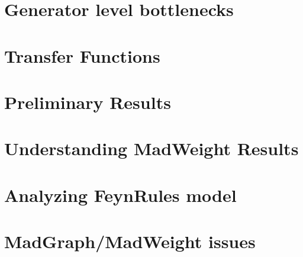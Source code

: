 \documentclass[a4paper,12pt]{book}
\begin{document}
\chapter{Generator level bottlenecks}
%

\chapter{Transfer Functions}
%

\chapter{Preliminary Results}
%

\chapter{Understanding MadWeight Results}
%

\chapter{Analyzing FeynRules model}
%

\chapter{MadGraph/MadWeight issues}
%
\end{document}
